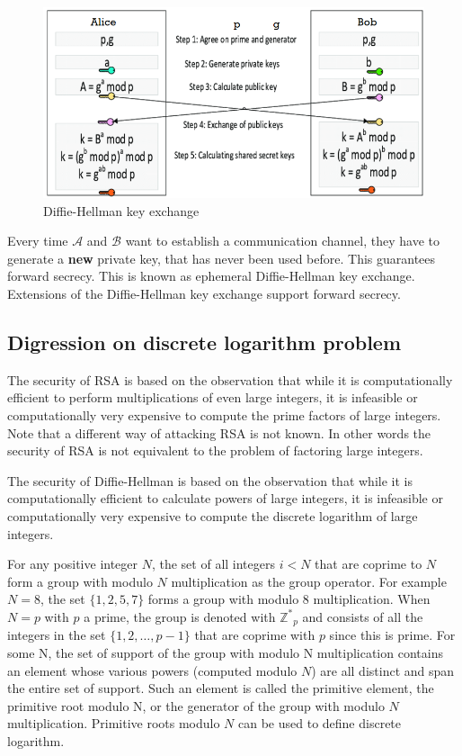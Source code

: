 \begin{figure}
	\centering
	\includegraphics[width=0.7\linewidth]{Images/Chapter5/diffie-hellman}
	\caption{Diffie-Hellman key exchange}
	\label{fig:diffie-hellman-key-exchange}
\end{figure}


Every time $\mathcal{A}$ and $\mathcal{B}$ want to establish a communication channel, they have to generate a \textbf{new} private key, that has never been used before. This guarantees forward secrecy. This is known as ephemeral Diffie-Hellman key exchange.
Extensions of the Diffie-Hellman key exchange support forward secrecy.

\subsection{Digression on discrete logarithm problem}

The security of RSA is based on the observation that while it is computationally efficient to perform multiplications of even large integers, it is infeasible or computationally very expensive to compute the prime factors of large integers. Note that a different way of attacking RSA is not known. In other words the security of RSA is not equivalent to the problem of factoring large integers.


The security of Diffie-Hellman is based on the observation that while it is computationally efficient to calculate powers of large integers, it is infeasible or computationally very expensive to compute the discrete logarithm of large integers.

For any positive integer $N$, the set of all integers $i < N$ that are coprime to $N$ form a group with modulo $N$ multiplication as the group operator. For example $N=8$, the set $\{1,2,5,7\}$ forms a group with modulo $8$ multiplication. When $N=p$ with $p$ a prime, the group is denoted with $\mathbb{Z^*}_p$ and consists of all the integers in the set $\{1, 2, \ldots, p-1\}$ that are coprime with $p$ since this is prime.
For some N, the set of support of the group with modulo N multiplication contains an element whose various powers (computed modulo $N$) are all distinct and span the entire set of support. Such an element is called the primitive element, the primitive root modulo N, or the generator of the group with modulo $N$ multiplication. Primitive roots modulo $N$ can be used to define discrete logarithm.

